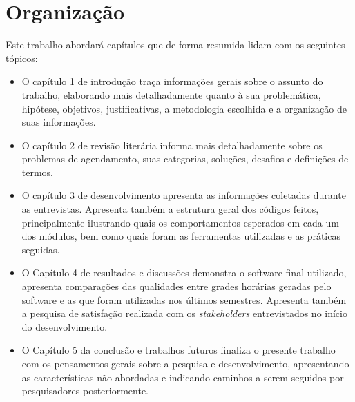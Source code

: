 \section{Organização} %

Este trabalho abordará capítulos que de forma resumida lidam com os seguintes tópicos:

\begin{itemize} 
    \item O capítulo 1 de introdução traça informações gerais sobre o assunto do trabalho, elaborando mais detalhadamente quanto à sua problemática, hipótese, objetivos, justificativas, a metodologia escolhida e a organização de suas informações.
    \item O capítulo 2 de revisão literária informa mais detalhadamente sobre os problemas de agendamento, suas categorias, soluções, desafios e definições de termos.
    \item O capítulo 3 de desenvolvimento apresenta as informações coletadas durante as entrevistas. Apresenta também a estrutura geral dos códigos feitos, principalmente ilustrando quais os comportamentos esperados em cada um dos módulos, bem como quais foram as ferramentas utilizadas e as práticas seguidas.
    \item O Capítulo 4 de resultados e discussões demonstra o software final utilizado, apresenta comparações das qualidades entre grades horárias geradas pelo software e as que foram utilizadas nos últimos semestres. Apresenta também a pesquisa de satisfação realizada com os \textit{stakeholders} entrevistados no início do desenvolvimento.
    \item O Capítulo 5 da conclusão e trabalhos futuros finaliza o presente trabalho com os pensamentos gerais sobre a pesquisa e desenvolvimento, apresentando as características não abordadas e indicando caminhos a serem seguidos por pesquisadores posteriormente.
\end{itemize}
